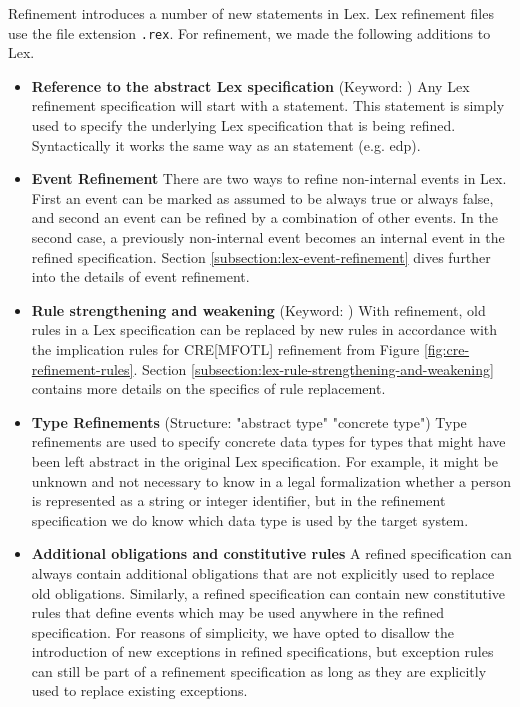 Refinement introduces a number of new statements in Lex.
Lex refinement files use the file extension \texttt{.rex}.
For refinement, we made the following additions to Lex.
\begin{itemize}
    \item \textbf{Reference to the abstract Lex specification}
        (Keyword: )
        Any Lex refinement specification will start with a 
        statement.
        This statement is simply used to specify the underlying Lex
        specification that is being refined.
        Syntactically it works the same way as an  statement
        (e.g.  edp).
    \item \textbf{Event Refinement}
        There are two ways to refine non-internal events in Lex.
        First an event can be marked as assumed to be
        always true or always false,
        and second an event can be refined by
        a combination of other events.
        In the second case, a previously non-internal event
        becomes an internal event in the refined
        specification.
        Section \ref{subsection:lex-event-refinement} dives 
        further into the details of event refinement.
    \item \textbf{Rule strengthening and weakening}
        (Keyword: )
        With refinement, old rules in a Lex specification
        can be replaced by new rules in accordance with
        the implication rules for CRE[MFOTL] refinement
        from Figure \ref{fig:cre-refinement-rules}.
        Section \ref{subsection:lex-rule-strengthening-and-weakening}
        contains more details on the specifics of rule replacement.
    \item \textbf{Type Refinements}
        (Structure:   "abstract type"  "concrete type")
        Type refinements are used
        to specify concrete data types for types that
        might have been left abstract in the original
        Lex specification.
        For example, it might be unknown and not necessary
        to know in a legal formalization whether
        a person is represented as a string or integer
        identifier, but in the refinement specification
        we do know which data type is used by the target system.
    \item \textbf{Additional obligations and constitutive rules}
        A refined specification can always contain additional
        obligations that are not explicitly used to
        replace old obligations.
        Similarly, a refined specification can contain
        new constitutive rules that define events which
        may be used anywhere in the refined specification.
        For reasons of simplicity, we have opted to
        disallow the introduction of new exceptions in refined
        specifications, but exception rules can still
        be part of a refinement specification as long
        as they are explicitly used to replace
        existing exceptions.
\end{itemize}

